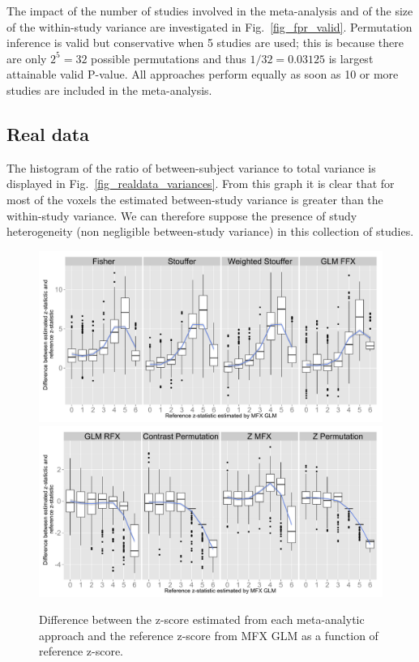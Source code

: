 \documentclass{llncs}
\begin{document}
The impact of the number of studies involved in the meta-analysis and of the size of the within-study variance are investigated in Fig.~\ref{fig_fpr_valid}. Permutation inference is valid but conservative when 5 studies are used; this is because there are only $2^5=32$ possible permutations and thus $1/32=0.03125$ is largest attainable valid P-value. All approaches perform equally as soon as 10 or more studies are included in the meta-analysis. 


\subsection{Real data}



The histogram of the ratio of between-subject variance to total variance is displayed in Fig.~\ref{fig_realdata_variances}. From this graph it is clear that for most of the voxels the estimated between-study variance is greater than the within-study variance. We can therefore suppose the presence of study heterogeneity (non negligible between-study variance) in this collection of studies.

\begin{figure}[t]
	\centering
	\includegraphics[width=0.8\linewidth]{./Rplot_realdata_ffx.pdf}
	\includegraphics[width=0.8\linewidth]{./Rplot_realdata_rfx.pdf}
	\caption{Difference between the z-score estimated from each meta-analytic approach and the reference z-score from MFX GLM as a function of reference z-score.}
	\label{fig_realdata}
\end{figure}
\end{document}
